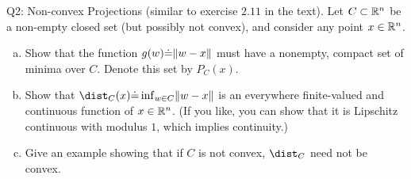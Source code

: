 \documentclass{article}
\begin{document}
\begin{problem}
    {Q2: Non-convex Projections (similar to exercise $2.11$ in the text).}
    Let $C\subset\mathbb{R}^n$ be a non-empty closed set (but possibly not convex), and consider any point $x\in\mathbb{R}^n$.
    \begin{enumerate}[(a)]
        \item Show that the function $g(w)\dot{=}\lVert w-x\rVert$ must have a nonempty, compact set of minima over $C$. Denote this set by $P_C(x)$.
        \item Show that $\dist_C(x)\dot{=}\inf_{w\in C}\norm{w-x}$ is an everywhere finite-valued and continuous function of $x\in\mathbb{R}^n$. (If you like, you can show that it is Lipschitz continuous with modulus $1$, which implies continuity.)
        \item Give an example showing that if $C$ is not convex, $\dist_C$ need not be convex.
    \end{enumerate}
\end{problem}
\end{document}
